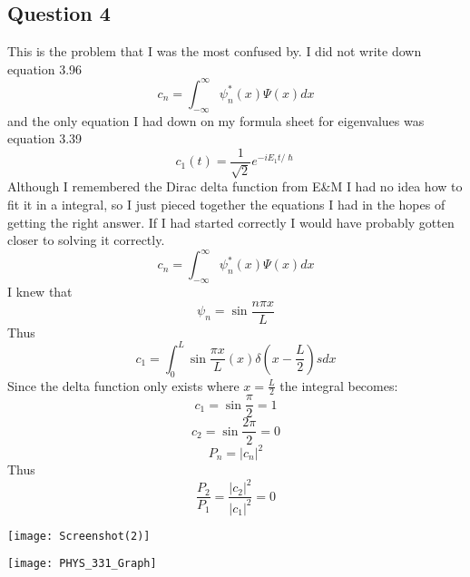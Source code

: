 \documentclass{article}
\begin{document}
\subsection*{Question 4}
This is the problem that I was the most confused by. I did not write down equation 3.96
$$c_n=\int_{-\infty}^{\infty}\psi^*_n(x)\Psi(x)dx$$
and the only equation I had down on my formula sheet for eigenvalues was equation 3.39
$$c_1(t)=\frac{1}{\sqrt{2}}e^{-iE_1t/\hslash}$$
Although I remembered the Dirac delta function from E\&M I had no idea how to fit it in a integral, so I just pieced together the equations I had in the hopes of getting the right answer. If I had started correctly I would have probably gotten closer to solving it correctly.
$$c_n=\int_{-\infty}^{\infty}\psi^*_n(x)\Psi(x)dx$$
I knew that 
$$\psi_n=\sin\frac{n\pi x}{L}$$
Thus
$$c_1=\int_0^L\sin\frac{\pi x}{L}(x)\delta(x-\frac{L}{2})sdx$$
Since the delta function only exists where $x=\frac{L}{2}$ the integral becomes:
$$c_1=\sin\frac{\pi}{2}=1$$
$$c_2=\sin\frac{2\pi}{2}=0$$
$$P_n=|c_n|^2$$
Thus
$$\frac{P_2}{P_1}=\frac{|c_2|^2}{|c_1|^2}=0$$

\pagebreak

\texttt{[image: Screenshot(2)]}

\bigskip

\texttt{[image: PHYS\_331\_Graph]}
\end{document}
